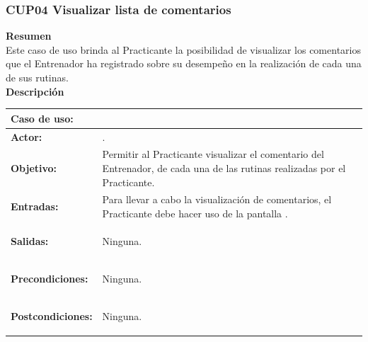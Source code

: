\subsubsection{CUP04 Visualizar lista de comentarios}
\label{cu:CUP04}

\textbf{\textcolor[rgb]{0, 0, 0.545098}{Resumen}} \\

Este caso de uso brinda al Practicante la posibilidad de visualizar los comentarios que el Entrenador ha registrado sobre su desempeño en la realización de cada una de sus rutinas.\\

\textbf{\textcolor[rgb]{0, 0, 0.545098}{Descripción}}

\begin{table}[H]
\centering
\begin{tabular}{| l | p{12 cm} |}
\hline
\rowcolor[rgb]{0.529412, 0.807843, 0.980392} {\textbf{Caso de uso:}} & \hspace{7em}{\textbf{CUP04 Visualizar lista de comentarios}}\\
\hline
\textbf{Actor:} &  \nameref{act:Practicante}. \\
\hline
\textbf{Objetivo:} & Permitir al Practicante visualizar el comentario del Entrenador, de cada una de las rutinas realizadas por el Practicante.\\
\hline
\textbf{Entradas:} & Para llevar a cabo la visualización de comentarios, el Practicante debe hacer uso de la pantalla \nameref{pant:IUP04}. \\
\hline
\textbf{Salidas:} &	\vspace{-2mm}	%
					\begin{compactitem}
						\setlength\itemsep{-0.25em}
						\item Ninguna.
					\end{compactitem}\\
\hline
\textbf{Precondiciones:} & 	\vspace{-2mm}	%
							\begin{compactitem}
							\setlength\itemsep{-0.25em}
								\item Ninguna.
							\end{compactitem} \\
\hline
\textbf{Postcondiciones:} & \vspace{-2mm}	%
							\begin{compactitem}
								\item Ninguna.
							\end{compactitem}\\
							

\end{tabular}
\end{table}
